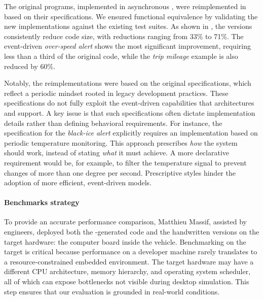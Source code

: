 The original programs, implemented in asynchronous \Rust, were reimplemented in \GRust based on
their specifications. We ensured functional equivalence by validating the new implementations
against the existing test suites. As shown in , the \GRust versions
consistently reduce code size, with reductions ranging from 33\% to 71\%. The event-driven
\emph{over-speed alert} shows the most significant improvement, requiring less than a third of the
original code, while the \emph{trip mileage} example is also reduced by 60\%.

Notably, the reimplementations were based on the original specifications, which reflect a
periodic mindset rooted in legacy development practices. These specifications do not fully
exploit the event-driven capabilities that \sdv architectures and \GRust support. A key issue is
that such specifications often dictate implementation details rather than defining behavioral
requirements. For instance, the specification for the \emph{black-ice alert} explicitly requires an
implementation based on periodic temperature monitoring. This approach prescribes
\emph{how} the system should work, instead of stating \emph{what} it must achieve. A more
declarative requirement would be, for example, to filter the temperature signal to prevent changes
of more than one degree per second. Prescriptive styles hinder the adoption of more efficient,
event-driven models.

\paragraph{Benchmarks strategy}

To provide an accurate performance comparison, Matthieu Massif, assisted by \ampere engineers,
deployed both the \GRust-generated code and the handwritten \Rust versions on the target hardware:
the computer board inside the vehicle.
Benchmarking on the target is critical because performance on a developer machine rarely translates
to a resource-constrained embedded environment. The target hardware may have a different CPU
architecture, memory hierarchy, and operating system scheduler, all of which can expose bottlenecks
not visible during desktop simulation. This step ensures that our evaluation is grounded in
real-world conditions.

